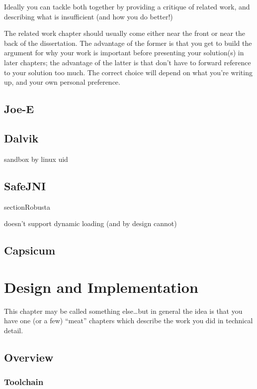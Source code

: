 \documentclass[a4paper,12pt,twoside,openright]{report}
\begin{document}
Ideally you can tackle both together by providing a critique of
related work, and describing what is insufficient (and how you do
better!)

The related work chapter should usually come either near the front or
near the back of the dissertation. The advantage of the former is that
you get to build the argument for why your work is important before
presenting your solution(s) in later chapters; the advantage of the
latter is that don't have to forward reference to your solution too
much. The correct choice will depend on what you're writing up, and
your own personal preference.

\section{Joe-E}

\section{Dalvik}

sandbox by linux uid

\section{SafeJNI}

section{Robusta}

doesn't support dynamic loading (and by design cannot)

\section{Capsicum}

\chapter{Design and Implementation} 

This chapter may be called something else\ldots but in general 
the idea is that you have one (or a few) ``meat'' chapters which
describe the work you did in technical detail. 

\section{Overview}

\subsection{Toolchain}
\end{document}
